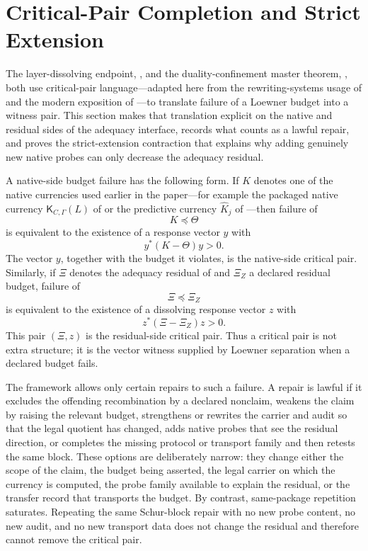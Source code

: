\documentclass[11pt]{article}
\newcommand{\K}{\mathsf K}
\newcommand{\preceqq}{\preceq}
\theoremstyle{definition}
\begin{document}
 

\section{Critical-Pair Completion and Strict Extension}
\label{sec:critical-pairs}

The layer-dissolving endpoint, ,
and the duality-confinement master theorem,
, both use critical-pair
language---adapted here from the rewriting-systems usage of
\citet{KnuthBendix1970SimpleWord} and the modern exposition of
\citet{BaaderNipkow1998TermRewriting}---to translate failure of a
Loewner budget into a witness pair.
This section makes that translation explicit on the native and
residual sides of the adequacy interface, records what counts as a
lawful repair, and proves the strict-extension contraction that
explains why adding genuinely new native probes can only decrease the
adequacy residual.

A native-side budget failure has the following form.  If \(K\) denotes
one of the native currencies used earlier in the paper---for example
the packaged native currency \(\K_{C,\Gamma}(L)\) of 
or the predictive currency \(\widehat K_j\) of
---then failure of
\[
  K\preceqq\Theta
\]
is equivalent to the existence of a response vector \(y\) with
\[
  y^*(K-\Theta)y>0.
\]
The vector \(y\), together with the budget it violates, is the
native-side critical pair.  Similarly, if \(\Xi\) denotes the adequacy
residual of  and \(\Xi_Z\) a declared residual
budget, failure of
\[
  \Xi\preceqq\Xi_Z
\]
is equivalent to the existence of a dissolving response vector \(z\)
with
\[
  z^*(\Xi-\Xi_Z)z>0.
\]
This pair \((\Xi,z)\) is the residual-side critical pair.  Thus a
critical pair is not extra structure; it is the vector witness supplied
by Loewner separation when a declared budget fails.

The framework allows only certain repairs to such a failure.  A repair
is lawful if it excludes the offending recombination by a declared
nonclaim, weakens the claim by raising the relevant budget, strengthens
or rewrites the carrier and audit so that the legal quotient has
changed, adds native probes that see the residual direction, or
completes the missing protocol or transport family and then retests the
same block.  These options are deliberately narrow: they change either
the scope of the claim, the budget being asserted, the legal carrier on
which the currency is computed, the probe family available to explain
the residual, or the transfer record that transports the budget.  By
contrast, same-package repetition saturates.  Repeating the same
Schur-block repair with no new probe content, no new audit, and no new
transport data does not change the residual and therefore cannot remove
the critical pair.
\end{document}
